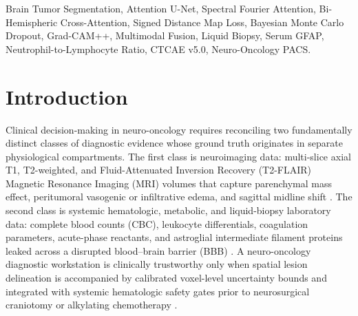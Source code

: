\documentclass[journal,onecolumn,10pt]{IEEEtran}
\begin{document}
\begin{IEEEkeywords}
Brain Tumor Segmentation, Attention U-Net, Spectral Fourier Attention, Bi-Hemispheric Cross-Attention, Signed Distance Map Loss, Bayesian Monte Carlo Dropout, Grad-CAM++, Multimodal Fusion, Liquid Biopsy, Serum GFAP, Neutrophil-to-Lymphocyte Ratio, CTCAE v5.0, Neuro-Oncology PACS.
\end{IEEEkeywords}

\section{Introduction}
Clinical decision-making in neuro-oncology requires reconciling two fundamentally distinct classes of diagnostic evidence whose ground truth originates in separate physiological compartments. The first class is neuroimaging data: multi-slice axial T1, T2-weighted, and Fluid-Attenuated Inversion Recovery (T2-FLAIR) Magnetic Resonance Imaging (MRI) volumes that capture parenchymal mass effect, peritumoral vasogenic or infiltrative edema, and sagittal midline shift \cite{menze2015brats, bakas2017advancing, buda2019association}. The second class is systemic hematologic, metabolic, and liquid-biopsy laboratory data: complete blood counts (CBC), leukocyte differentials, coagulation parameters, acute-phase reactants, and astroglial intermediate filament proteins leaked across a disrupted blood--brain barrier (BBB) \cite{bambury2013nlr, perez2021gfap, louis2021who}. A neuro-oncology diagnostic workstation is clinically trustworthy only when spatial lesion delineation is accompanied by calibrated voxel-level uncertainty bounds and integrated with systemic hematologic safety gates prior to neurosurgical craniotomy or alkylating chemotherapy \cite{stupp2005radiotherapy, ctcae2017v5}.
\end{document}
